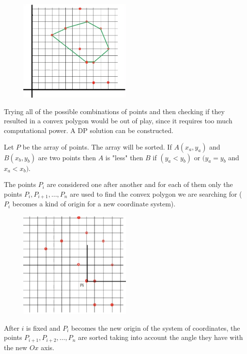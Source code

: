 \documentclass[letterpaper]{article}
\begin{document}
\begin{figure} [h!]
\centering
\includegraphics[width=0.5\textwidth]{pngOfDiagrams/minnumberofverticesDP.png}
\end{figure}

Trying all of the possible combinations of points and then checking if they resulted in a convex polygon would be out of play, since it requires too much computational power. A DP solution can be constructed.

Let $P$ be the array of points. The array will be sorted. If $A(x_a, y_a)$ and $B(x_b, y_b)$ are two points then $A$ is "less" then $B$ if $(y_a < y_b)$ or $(y_a = y_b$ and $x_a < x_b)$.

The points $P_i$ are considered one after another and for each of them only the points $P_i, P_{i + 1}, \dots, P_n$ are used to find the convex polygon we are searching for ($P_i$ becomes a kind of origin for a new coordinate system).

\newpage

\begin{figure} [h!]
\centering
\includegraphics[width=0.5\textwidth]{pngOfDiagrams/minnumberofverticesDP2.png}
\end{figure}

After $i$ is fixed and $P_i$ becomes the new origin of the system of coordinates, the points $P_{i + 1}, P_{i + 2}, \dots, P_n$ are sorted taking into account the angle they have with the new $Ox$ axis.
\end{document}
